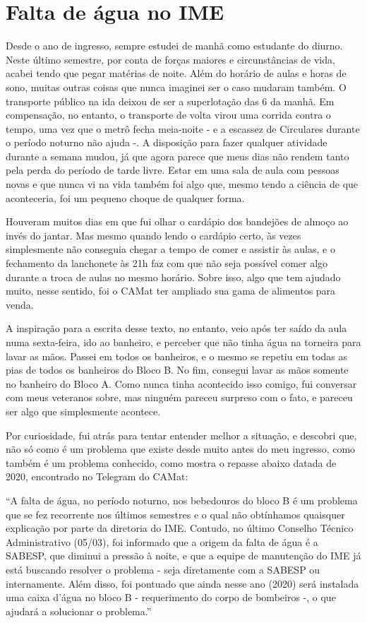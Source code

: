 \section*{Falta de água no IME}
\avisoTextoForms

Desde o ano de ingresso, sempre estudei de manhã como estudante do diurno. Neste último semestre, por conta de forças maiores e circunstâncias de vida, acabei tendo que pegar matérias de noite. Além do horário de aulas e horas de sono, muitas outras coisas que nunca imaginei ser o caso mudaram também. O transporte público na ida deixou de ser a superlotação das 6 da manhã. Em compensação, no entanto, o transporte de volta virou uma corrida contra o tempo, uma vez que o metrô fecha meia-noite - e a escassez de Circulares durante o período noturno não ajuda -. A disposição para fazer qualquer atividade durante a semana mudou, já que agora parece que meus dias não rendem tanto pela perda do período de tarde livre. Estar em uma sala de aula com pessoas novas e que nunca vi na vida também foi algo que, mesmo tendo a ciência de que aconteceria, foi um pequeno choque de qualquer forma.

Houveram muitos dias em que fui olhar o cardápio dos bandejões de almoço ao invés do jantar. Mas mesmo quando lendo o cardápio certo, às vezes simplesmente não conseguia chegar a tempo de comer e assistir às aulas, e o fechamento da lanchonete às 21h faz com que não seja possível comer algo durante a troca de aulas no mesmo horário. Sobre isso, algo que tem ajudado muito, nesse sentido, foi o CAMat ter ampliado sua gama de alimentos para venda.

A inspiração para a escrita desse texto, no entanto, veio após ter saído da aula numa sexta-feira, ido ao banheiro, e perceber que não tinha água na torneira para lavar as mãos. Passei em todos os banheiros, e o mesmo se repetiu em todas as pias de todos os banheiros do Bloco B. No fim, consegui lavar as mãos somente no banheiro do Bloco A. Como nunca tinha acontecido isso comigo, fui conversar com meus veteranos sobre, mas ninguém pareceu surpreso com o fato, e pareceu ser algo que simplesmente acontece.

Por curiosidade, fui atrás para tentar entender melhor a situação, e descobri que, não só como é um problema que existe desde muito antes do meu ingresso, como também é um problema conhecido, como mostra o repasse abaixo datada de 2020, encontrado no Telegram do CAMat:

“A falta de água, no período noturno, nos bebedouros do bloco B é um problema que se fez recorrente nos últimos semestres e o qual não obtínhamos quaisquer explicação por parte da diretoria do IME. Contudo, no último Conselho Técnico Administrativo (05/03), foi informado que a origem da falta de água é a SABESP, que diminui a pressão à noite, e que a equipe de manutenção do IME já está buscando resolver o problema - seja diretamente com a SABESP ou internamente. Além disso, foi pontuado que ainda nesse ano (2020) será instalada uma caixa d’água no bloco B - requerimento do corpo de bombeiros -, o que ajudará a solucionar o problema.”

